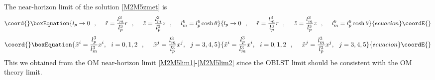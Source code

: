 \documentclass[a4paper,twoside,titlepage,12pt]{article}
\begin{document}
The near-horizon limit of the solution \eqref{M2M5zmet} is
%
\begin{equation}\coord{}\boxEquation{
\label{M2M5zlim1}
l_p \rightarrow 0 \spa
\tilde{r} = \frac{\lm^3}{l_p^3} r \spa
\tilde{z} = \frac{\lm^3}{l_p^3} z \spa
\lm^6 = l_p^6 \cosh \theta
}{
l_p \rightarrow 0 \spa
\tilde{r} = \frac{\lm^3}{l_p^3} r \spa
\tilde{z} = \frac{\lm^3}{l_p^3} z \spa
\lm^6 = l_p^6 \cosh \theta
}{ecuacion}\coordE{}\end{equation}
%
\begin{equation}\coord{}\boxEquation{
\label{M2M5zlim2}
\tilde{x}^i = \frac{l_p^3}{\lm^3} x^i, \ \ i=0,1,2 \spa
\tilde{x}^j = \frac{\lm^3}{l_p^3} x^j,\ \ j=3,4,5 
}{
\tilde{x}^i = \frac{l_p^3}{\lm^3} x^i, \ \ i=0,1,2 \spa
\tilde{x}^j = \frac{\lm^3}{l_p^3} x^j,\ \ j=3,4,5 
}{ecuacion}\coordE{}\end{equation}
%
This we obtained from the OM near-horizon limit 
\eqref{M2M5lim1}-\eqref{M2M5lim2} since the \coordHE{} OBLST limit
should be consistent with the OM theory limit.
\end{document}
